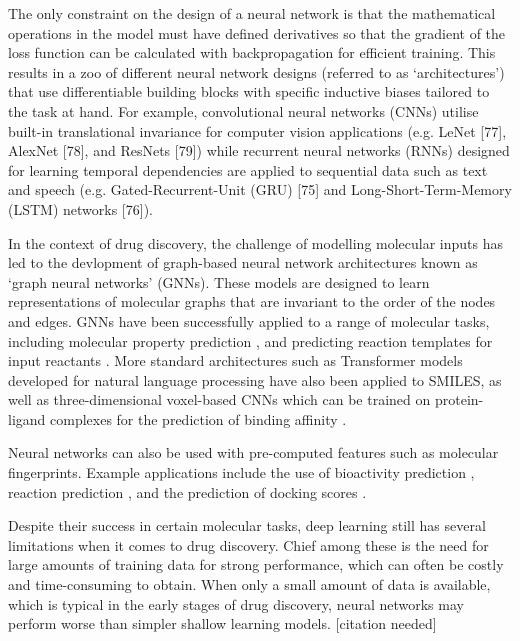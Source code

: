 The only constraint on the design of a neural network is that the mathematical operations in the model must have defined derivatives so that the gradient of the loss function can be calculated with backpropagation for efficient training. This results in a zoo of different neural network designs (referred to as `architectures') that use differentiable building blocks with specific inductive biases tailored to the task at hand. For example, convolutional neural networks (CNNs) utilise built-in translational invariance for computer vision applications (e.g. LeNet [77], AlexNet [78], and ResNets [79]) while recurrent neural networks (RNNs) designed for learning temporal dependencies are applied to sequential data such as text and speech (e.g. Gated-Recurrent-Unit (GRU) [75] and Long-Short-Term-Memory (LSTM) networks [76]). 

In the context of drug discovery, the challenge of modelling molecular inputs has led to the devlopment of graph-based neural network architectures known as `graph neural networks' (GNNs). These models are designed to learn representations of molecular graphs that are invariant to the order of the nodes and edges. GNNs have been successfully applied to a range of molecular tasks, including molecular property prediction \cite{wu2017molnet,Gilmer17mpnn, Mayr2018compare, yang2019chemprop}, and predicting reaction templates for input reactants \cite{Coley19WLDN5}. More standard architectures such as Transformer models developed for natural language processing have also been applied to SMILES, as well as three-dimensional voxel-based CNNs which can be trained on protein-ligand complexes for the prediction of binding affinity \cite{Ragoza2017ProteinCNN,Imrie2018ProteinCNN,Jimenez2018Kdeep}.

Neural networks can also be used with pre-computed features such as molecular fingerprints. Example applications include the use of bioactivity prediction \cite{Bender2019}, reaction prediction \cite{Wei2016reactionprediction, segler2017neural}, and the prediction of docking scores \cite{Gentile2020deepdocking}.

Despite their success in certain molecular tasks, deep learning still has several limitations when it comes to drug discovery. Chief among these is the need for large amounts of training data for strong performance, which can often be costly and time-consuming to obtain. When only a small amount of data is available, which is typical in the early stages of drug discovery, neural networks may perform worse than simpler shallow learning models. [citation needed]

